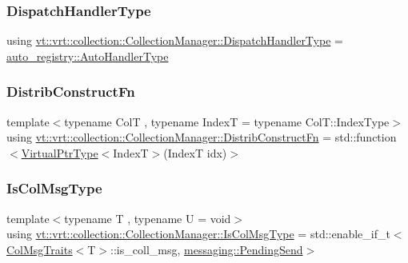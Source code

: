 \subsubsection{\texorpdfstring{Dispatch\+Handler\+Type}{DispatchHandlerType}}
{\footnotesize\ttfamily using \hyperlink{structvt_1_1vrt_1_1collection_1_1_collection_manager_a0cfe02a0426e95ec9daa2ef7374e07c7}{vt\+::vrt\+::collection\+::\+Collection\+Manager\+::\+Dispatch\+Handler\+Type} =  \hyperlink{namespacevt_1_1auto__registry_ae295e18699146815bb7d7674594d95d7}{auto\+\_\+registry\+::\+Auto\+Handler\+Type}}

\mbox{\label{structvt_1_1vrt_1_1collection_1_1_collection_manager_a9ef5ab71e344fdee8525c3f18241c305}} 
\subsubsection{\texorpdfstring{Distrib\+Construct\+Fn}{DistribConstructFn}}
{\footnotesize\ttfamily template$<$typename ColT , typename IndexT  = typename Col\+T\+::\+Index\+Type$>$ \\
using \hyperlink{structvt_1_1vrt_1_1collection_1_1_collection_manager_a9ef5ab71e344fdee8525c3f18241c305}{vt\+::vrt\+::collection\+::\+Collection\+Manager\+::\+Distrib\+Construct\+Fn} =  std\+::function$<$\hyperlink{structvt_1_1vrt_1_1collection_1_1_collection_manager_a086cab4af6af4f869fbf8814c3a9a6a4}{Virtual\+Ptr\+Type}$<$IndexT$>$(IndexT idx)$>$}

\mbox{\label{structvt_1_1vrt_1_1collection_1_1_collection_manager_a21c21612c806016788057aeab142af20}} 
\subsubsection{\texorpdfstring{Is\+Col\+Msg\+Type}{IsColMsgType}}
{\footnotesize\ttfamily template$<$typename T , typename U  = void$>$ \\
using \hyperlink{structvt_1_1vrt_1_1collection_1_1_collection_manager_a21c21612c806016788057aeab142af20}{vt\+::vrt\+::collection\+::\+Collection\+Manager\+::\+Is\+Col\+Msg\+Type} =  std\+::enable\+\_\+if\+\_\+t$<$\hyperlink{structvt_1_1vrt_1_1collection_1_1_col_msg_traits}{Col\+Msg\+Traits}$<$T$>$\+::is\+\_\+coll\+\_\+msg, \hyperlink{structvt_1_1messaging_1_1_pending_send}{messaging\+::\+Pending\+Send}$>$}

